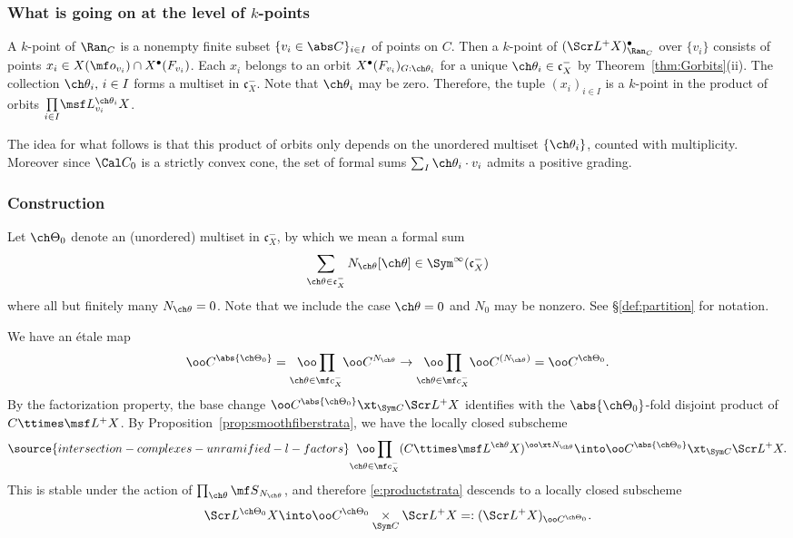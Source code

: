 \subsubsection{What is going on at the level of $k$-points}
A $k$-point of $\Ran_C$ is a nonempty finite subset
$\{ v_i \in \abs C \}_{i\in I}$ of points on $C$.
Then a $k$-point of $(\Scr L^+X)^\bullet_{\Ran_C}$ over $\{v_i\}$ consists
of points $x_i \in X(\mf o_{v_i}) \cap X^\bullet(F_{v_i})$.
Each $x_i$ belongs to an orbit $X^\bullet(F_{v_i})_{G:\ch\theta_i}$
for a unique $\ch\theta_i \in \mathfrak c_X^-$ by Theorem~\ref{thm:Gorbits}(ii).
The collection $\ch\theta_{i},\, i\in I$ forms a multiset
in $\mathfrak c_X^-$.
Note that $\ch\theta_{i}$ may be zero.
Therefore, the tuple $(x_i)_{i\in I}$ is a $k$-point in the product of orbits
$\underset{i\in I}\prod \msf L^{\ch\theta_i}_{v_i} X$.

The idea for what follows is that this product of orbits only depends on
the unordered multiset $\{\ch\theta_i\}$, counted with multiplicity.
Moreover since $\Cal C_0$ is a strictly convex cone,
the set of formal sums $\sum_I \ch\theta_i \cdot v_i$ admits a positive grading.

\subsubsection{Construction}\label{sect:constructstrata}
Let $\ch\Theta_0$ denote an (unordered) multiset in $\mathfrak c_X^-$, by
which we mean a formal sum
\[ \sum_{\ch\theta\in \mathfrak c_X^- } N_{\ch\theta} [\ch\theta] \in \Sym^\infty(\mathfrak c_X^-) \]
where all but finitely many $N_{\ch\theta}=0$.
Note that we include the case $\ch\theta=0$ and $N_0$ may be nonzero.
See \S\ref{def:partition} for notation.

We have an \'etale map
\[ \oo C^{\abs{\ch\Theta_0}} = \underset{\ch\theta \in \mf c_X^-}{\oo\prod} \oo C^{N_{\ch\theta}}
\to \underset{\ch\theta \in \mf c_X^-}{\oo\prod} \oo C^{(N_{\ch\theta})} = \oo C^{\ch\Theta_0}.
\]
By the factorization property, the base change
$\oo C^{\abs{\ch\Theta_0}} \xt_{\Sym C} \Scr L^+ X$ identifies with the $\abs{\ch\Theta_0}$-fold
disjoint product of $C \ttimes \msf L^+ X$.
By Proposition~\ref{prop:smoothfiberstrata}, we have the locally closed
subscheme
\begin{equation} \label{e:productstrata}
\source{intersection-complexes-unramified-l-factors}
\underset{\ch\theta \in \mf c_X^-}{\oo\prod} (C \ttimes \msf L^{\ch\theta} X)^{\oo\xt N_{\ch\theta}}
\into \oo C^{\abs{\ch\Theta_0}} \xt_{\Sym C} \Scr L^+ X.
\end{equation}
This is stable under the action of $\prod_{\ch\theta} {\mf S}_{N_{\ch\theta}}$,
and therefore \eqref{e:productstrata} descends to
a locally closed subscheme
\[ \Scr L^{\ch\Theta_0} X \into
\oo C^{\ch\Theta_0} \underset{\Sym C}\times \Scr L^+ X =: (\Scr L^+ X)_{\oo C^{\ch\Theta_0}}. \]

